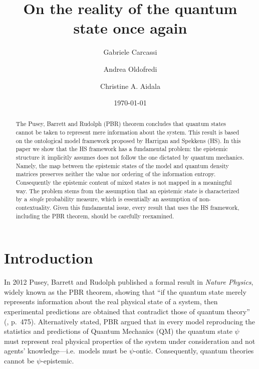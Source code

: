 \documentclass[twocolumn,prl,floatfix,superscriptaddress]{revtex4-2}
\begin{document}
\title{On the reality of the quantum state once again}
\author{Gabriele Carcassi}
\author{Andrea Oldofredi}
\author{Christine A. Aidala}
\vspace{2mm}

\date{\today}


\begin{abstract}
The Pusey, Barrett and Rudolph (PBR) theorem concludes that quantum states cannot be taken to represent mere information about the system. This result is based on the ontological model framework proposed by Harrigan and Spekkens (HS). In this paper we show that the HS framework has a fundamental problem: the epistemic structure it implicitly assumes does not follow the one dictated by quantum mechanics. Namely, the map between the epistemic states of the model and quantum density matrices preserves neither the value nor ordering of the information entropy. Consequently the epistemic content of mixed states is not mapped in a meaningful way. The problem stems from the assumption that an epistemic state is characterized by a \emph{single} probability measure, which is essentially an assumption of non-contextuality. Given this fundamental issue, every result that uses the HS framework, including the PBR theorem, should be carefully reexamined.
\end{abstract}

\maketitle

\section{Introduction}
 
In 2012 Pusey, Barrett and Rudolph published a formal result in \emph{Nature Physics}, widely known as the PBR theorem, showing that ``if the quantum state merely represents information about the real physical state of a system, then experimental predictions are obtained that contradict those of quantum theory'' (\cite{PBR:2012}, p.\ 475). Alternatively stated, PBR argued that in every model reproducing the statistics and predictions of Quantum Mechanics (QM) the quantum state $\psi$ must represent real physical properties of the system under consideration and not agents' knowledge---i.e.\ models must be $\psi$-ontic. Consequently, quantum theories cannot be $\psi$-epistemic. 
\end{document}
